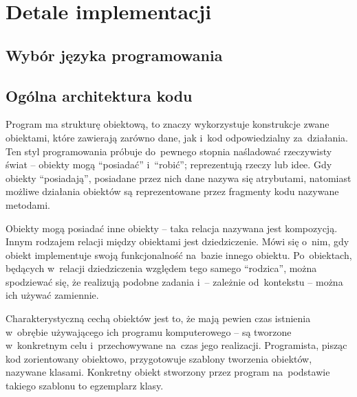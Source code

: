 \section{Detale implementacji}\label{tesliper:implementation}
\subsection{Wybór języka programowania}\label{implementation:language}
\subsection{Ogólna architektura kodu}\label{implementation:architecture}
Program \tesliper{} ma strukturę obiektową, to znaczy wykorzystuje konstrukcje zwane obiektami,
  które zawierają zarówno dane, jak i~kod odpowiedzialny za~działania.
Ten styl programowania próbuje do~pewnego stopnia naśladować rzeczywisty świat \---
  obiekty mogą \enquote{posiadać} i~\enquote{robić}; reprezentują rzeczy lub idee.
Gdy obiekty \enquote{posiadają}, posiadane przez nich dane nazywa się atrybutami,
  natomiast możliwe działania obiektów są reprezentowane przez fragmenty kodu nazywane metodami.

Obiekty mogą posiadać inne obiekty \--- taka relacja nazywana jest kompozycją.
Innym rodzajem relacji między obiektami jest dziedziczenie.
Mówi się o~nim, gdy obiekt implementuje swoją funkcjonalność na~bazie innego obiektu.
Po~obiektach, będących w~relacji dziedziczenia względem tego samego \enquote{rodzica},
  można spodziewać się, że realizują podobne zadania i~\--- zależnie od~kontekstu \--- 
  można ich używać zamiennie.

Charakterystyczną cechą obiektów jest to, że mają pewien czas istnienia w~obrębie używającego ich
  programu komputerowego \--- są tworzone w~konkretnym celu i~przechowywane na~czas jego realizacji.
Programista, pisząc kod zorientowany obiektowo, przygotowuje szablony tworzenia obiektów,
  nazywane klasami.
Konkretny obiekt stworzony przez program na~podstawie takiego szablonu to egzemplarz klasy.

